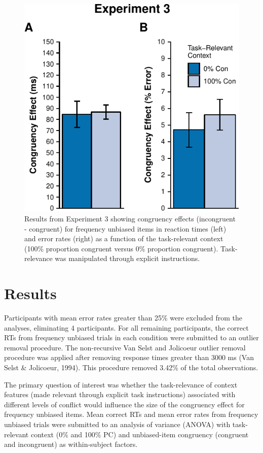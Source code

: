 \documentclass[english,,man,floatsintext]{apa6}
\begin{document}
\begin{figure}
\centering
\includegraphics{manuscript_pretty_files/figure-latex/figure4-1.pdf}
\caption{\label{fig:figure4}Results from Experiment 3 showing congruency effects (incongruent - congruent) for frequency unbiased items in reaction times (left) and error rates (right) as a function of the task-relevant context (100\% proportion congruent versus 0\% proportion congruent). Task-relevance was manipulated through explicit instructions.}
\end{figure}



\hypertarget{results-2}{%
\section{Results}\label{results-2}}

Participants with mean error rates greater than 25\% were excluded from the analyses, eliminating 4 participants. For all remaining participants, the correct RTs from frequency unbiased trials in each condition were submitted to an outlier removal procedure. The non-recursive Van Selst and Jolicoeur outlier removal procedure was applied after removing response times greater than 3000 ms (Van Selst \& Jolicoeur, 1994). This procedure removed 3.42\% of the total observations.

The primary question of interest was whether the task-relevance of context features (made relevant through explicit task instructions) associated with different levels of conflict would influence the size of the congruency effect for frequency unbiased items. Mean correct RTs and mean error rates from frequency unbiased trials were submitted to an analysis of variance (ANOVA) with task-relevant context (0\% and 100\% PC) and unbiased-item congruency (congruent and incongruent) as within-subject factors.
\end{document}
